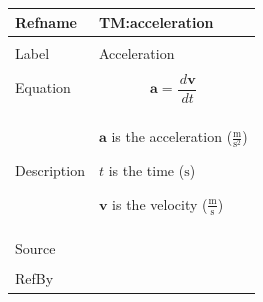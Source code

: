 \documentclass[12pt]{article}
\begin{document}
\vspace{\baselineskip}
\noindent
\begin{minipage}{\textwidth}
\begin{tabular}{>{\raggedright}p{}>{\raggedright\arraybackslash}p{}}
\toprule \textbf{Refname} & \textbf{TM:acceleration}
\label{TM:acceleration}
\\ \midrule \\
Label & Acceleration
        
\\ \midrule \\
Equation & \begin{displaymath}
           \mathbf{a}=\frac{\,d\mathbf{v}}{\,dt}
           \end{displaymath}
\\ \midrule \\
Description & \begin{symbDescription}
              \item{$\mathbf{a}$ is the acceleration ($\frac{\text{m}}{\text{s}^{2}}$)}
              \item{$t$ is the time (${\text{s}}$)}
              \item{$\mathbf{v}$ is the velocity ($\frac{\text{m}}{\text{s}}$)}
              \end{symbDescription}
\\ \midrule \\
Source & \cite{accelerationWiki}
         
\\ \midrule \\
RefBy & 
\\ \bottomrule
\end{tabular}
\end{minipage}
\vspace{\baselineskip}
\noindent
\end{document}
